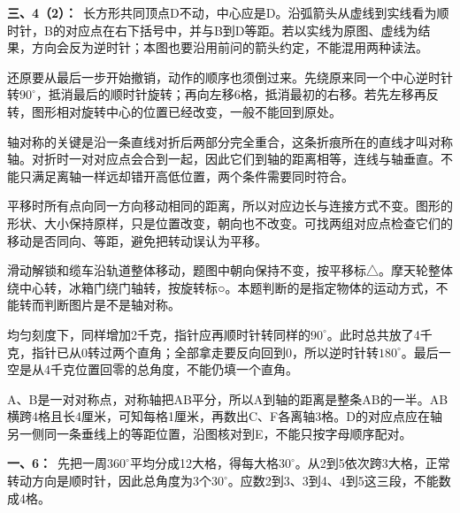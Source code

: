 \documentclass[multi=snippet,border=0pt]{standalone}
\newenvironment{snippet}[3]{\begin{minipage}{#1bp}\color{answerred}\fontsize{#2}{#3}\selectfont\raggedright}{\end{minipage}}
\begin{document}
\begin{snippet}{505}{11.5}{14}\textbf{三、4（2）：}\ 长方形共同顶点D不动，中心应是D。沿弧箭头从虚线到实线看为顺时针，B的对应点在右下括号中，并与B到D等距。若以实线为原图、虚线为结果，方向会反为逆时针；本图也要沿用前问的箭头约定，不能混用两种读法。\end{snippet}
\begin{snippet}{505}{11.5}{14}还原要从最后一步开始撤销，动作的顺序也须倒过来。先绕原来同一个中心逆时针转\(90^\circ\)，抵消最后的顺时针旋转；再向左移6格，抵消最初的右移。若先左移再反转，图形相对旋转中心的位置已经改变，一般不能回到原处。\end{snippet}
\begin{snippet}{505}{11.5}{14}轴对称的关键是沿一条直线对折后两部分完全重合，这条折痕所在的直线才叫对称轴。对折时一对对应点会合到一起，因此它们到轴的距离相等，连线与轴垂直。不能只满足离轴一样远却错开高低位置，两个条件需要同时符合。\end{snippet}
\begin{snippet}{505}{11.5}{14}平移时所有点向同一方向移动相同的距离，所以对应边长与连接方式不变。图形的形状、大小保持原样，只是位置改变，朝向也不改变。可找两组对应点检查它们的移动是否同向、等距，避免把转动误认为平移。\end{snippet}
\begin{snippet}{505}{11.5}{14}滑动解锁和缆车沿轨道整体移动，题图中朝向保持不变，按平移标△。摩天轮整体绕中心转，冰箱门绕门轴转，按旋转标○。本题判断的是指定物体的运动方式，不能转而判断图片是不是轴对称。\end{snippet}
\begin{snippet}{505}{11.5}{14}均匀刻度下，同样增加2千克，指针应再顺时针转同样的\(90^\circ\)。此时总共放了4千克，指针已从0转过两个直角；全部拿走要反向回到0，所以逆时针转\(180^\circ\)。最后一空是从4千克位置回零的总角度，不能仍填一个直角。\end{snippet}
\begin{snippet}{505}{11.5}{14}A、B是一对对称点，对称轴把AB平分，所以A到轴的距离是整条AB的一半。AB横跨4格且长4厘米，可知每格1厘米，再数出C、F各离轴3格。D的对应点应在轴另一侧同一条垂线上的等距位置，沿图核对到E，不能只按字母顺序配对。\end{snippet}
\begin{snippet}{505}{11.5}{14}\textbf{一、6：}\ 先把一周\(360^\circ\)平均分成12大格，得每大格\(30^\circ\)。从2到5依次跨3大格，正常转动方向是顺时针，因此总角度为3个\(30^\circ\)。应数2到3、3到4、4到5这三段，不能数成4格。\end{snippet}
\end{document}
